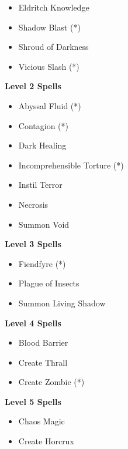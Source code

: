 \begin{multicols}{4}
{\begin{itemize}[itemsep=0em]
\item Eldritch Knowledge

\item Shadow Blast (*) 

\item Shroud of Darkness

\item Vicious Slash (*) 


\end{itemize}
\textbf{Level 2 Spells}
\begin{itemize}[itemsep=0em]
\renewcommand\labelitemi{-}
\item Abyssal Fluid (*) 

\item Contagion (*) 

\item Dark Healing

\item Incomprehensible Torture (*) 

\item Instil Terror

\item Necrosis

\item Summon Void


\end{itemize}
\textbf{Level 3 Spells}
\begin{itemize}[itemsep=0em]
\renewcommand\labelitemi{-}
\item Fiendfyre (*) 

\item Plague of Insects

\item Summon Living Shadow


\end{itemize}
\textbf{Level 4 Spells}
\begin{itemize}[itemsep=0em]
\renewcommand\labelitemi{-}
\item Blood Barrier

\item Create Thrall

\item Create Zombie (*) 


\end{itemize}
\textbf{Level 5 Spells}
\begin{itemize}[itemsep=0em]
\renewcommand\labelitemi{-}
\item Chaos Magic

\item Create Horcrux


\end{itemize}}
\end{multicols}
